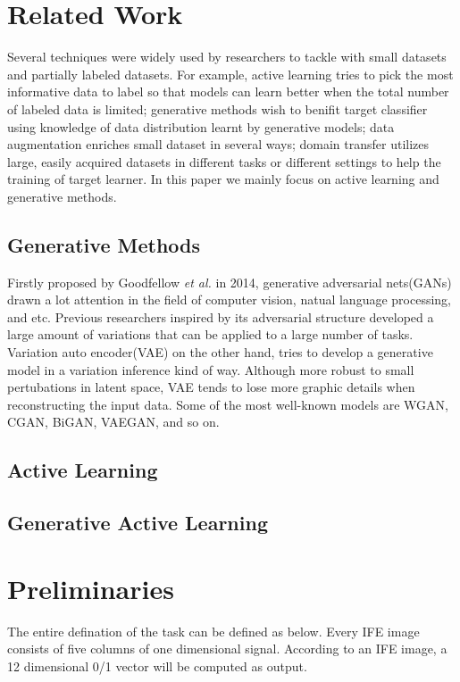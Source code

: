 \documentclass[letterpaper]{article}
\begin{document}
\section{Related Work}
Several techniques were widely used by researchers to tackle with small datasets and partially labeled datasets. For example, active learning\cite{settles2009active} tries to pick the most informative data to label so that models can learn better when the total number of labeled data is limited; generative methods\cite{kingma2014semi}\cite{springenberg2015unsupervised} wish to benifit target classifier using knowledge of data distribution learnt by generative models; data augmentation\cite{tanner1987calculation} enriches small dataset in several ways; domain transfer\cite{pan2009survey} utilizes large, easily acquired datasets in different tasks or different settings to help the training of target learner. In this paper we mainly focus on active learning and generative methods.
\subsection{Generative Methods}
Firstly proposed by Goodfellow \emph{et al.} in 2014, generative adversarial nets(GANs) \cite{goodfellow2014generative} drawn a lot attention in the field of computer vision, natual language processing, and etc. Previous researchers inspired by its adversarial structure developed a large amount of variations that can be applied to a large number of tasks. Variation auto encoder(VAE) on the other hand, tries to develop a generative model in a variation inference kind of way\cite{kingma2013auto}. Although more robust to small pertubations in latent space, VAE tends to lose more graphic details when reconstructing the input data. Some of the most well-known models are WGAN\cite{arjovsky2017wasserstein}, CGAN\cite{mirza2014conditional}, BiGAN\cite{donahue2016adversarial}, VAEGAN\cite{larsen2015autoencoding}, and so on. 
\subsection{Active Learning}
\subsection{Generative Active Learning}

\section{Preliminaries}
The entire defination of the task can be defined as below. Every IFE image consists of five columns of one dimensional signal. According to an IFE image, a 12 dimensional 0/1 vector will be computed as output.
\end{document}

